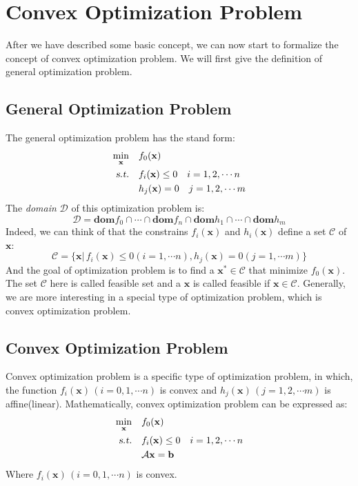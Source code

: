 \documentclass[10pt,a4paper]{article}
\begin{document}
\section{Convex Optimization Problem}
After we have described some basic concept, we can now start to formalize the concept of convex optimization problem. We will first give the definition of general optimization problem.

\subsection{General Optimization Problem}
The general optimization problem has the stand form:
\begin{equation}
	\begin{aligned}
		\displaystyle\min_{\mathbf{x}} \quad & f_{0}(\mathbf{x}) \\
		\textsl{s.t.} \quad & f_{i}(\mathbf{x}) \leq 0 \quad i = 1, 2, \cdots n \\
		& h_{j}(\mathbf{x}) = 0 \quad j = 1, 2, \cdots m
	\end{aligned}
\end{equation}
The \textit{domain} $\mathcal{D}$ of this optimization problem is:
\begin{equation*}
	\mathcal{D} = \mathbf{dom}f_{0} \cap \cdots \cap \mathbf{dom}f_{n} \cap \mathbf{dom}h_{1} \cap \cdots \cap \mathbf{dom}h_{m}
\end{equation*}
Indeed, we can think of that the constrains $f_{i}(\mathbf{x})$ and $h_{i}(\mathbf{x})$ define a set $\mathcal{C}$ of $\mathbf{x}$:
\begin{equation*}
	\mathcal{C} = \{ \mathbf{x} |\, f_{i}(\mathbf{x}) \leq 0(i = 1, \cdots n), h_{j}(\mathbf{x}) = 0(j = 1, \cdots m) \}
\end{equation*}
And the goal of optimization problem is to find a $\mathbf{x^{*}} \in \mathcal{C}$ that minimize $f_{0}(\mathbf{x})$. The set $\mathcal{C}$ here is called feasible set and a $\mathbf{x}$ is called feasible if $\mathbf{x} \in \mathcal{C}$. Generally, we are more interesting in a special type of optimization problem, which is convex optimization problem.

\subsection{Convex Optimization Problem}
Convex optimization problem is a specific type of optimization problem, in which, the function $f_{i}(\mathbf{x}) \, (i = 0, 1, \cdots n)$ is convex and $h_{j}(\mathbf{x}) \, (j = 1, 2, \cdots m)$ is affine(linear). Mathematically, convex optimization problem can be expressed as:
\begin{equation}
	\begin{aligned}
		\displaystyle\min_{\mathbf{x}} \quad & f_{0}(\mathbf{x}) \\
		\textsl{s.t.} \quad & f_{i}(\mathbf{x}) \leq 0 \quad i = 1, 2, \cdots n \\
		& \mathcal{A} \mathbf{x} = \mathbf{b} 
	\end{aligned}
\end{equation}
Where $f_{i}(\mathbf{x}) \, (i = 0, 1, \cdots n)$ is convex.
\end{document}
